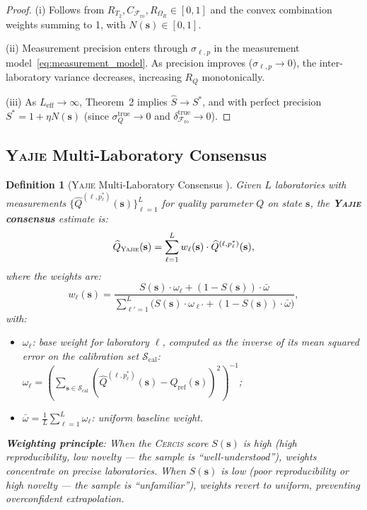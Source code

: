 \documentclass[11pt,a4paper]{article}
\newcommand{\eff}{\mathrm{eff}}
\newtheorem{definition}[theorem]{Definition}
\theoremstyle{definition}
\newcommand{\Yajie}{\textsc{Yajie}}
\newcommand{\Cercis}{\textsc{Cercis}}
\newcommand{\cS}{\mathcal{S}}
\newcommand{\Ttwo}{T_2}
\newcommand{\RabiFreq}{\Omega_R}
\newcommand{\FidReadout}{\mathcal{F}_{\text{ro}}}
\begin{document}
\begin{proof}
(i) Follows from $R_{\Ttwo}, C_{\FidReadout}, R_{\RabiFreq} \in [0,1]$
and the convex combination weights summing to 1, with $N(\mathbf{s}) \in [0,1]$.

(ii) Measurement precision enters through $\sigma_{\ell, p}$ in the
measurement model~\eqref{eq:measurement_model}. As precision improves
($\sigma_{\ell, p} \to 0$), the inter-laboratory variance decreases,
increasing $R_Q$ monotonically.

(iii) As $L_{\eff} \to \infty$, Theorem~2 implies $\widehat{S} \to S^*$,
and with perfect precision $S^* = 1 + \eta N(\mathbf{s})$ (since
$\sigma_Q^{\text{true}} \to 0$ and $\delta_{\FidReadout}^{\text{true}} \to 0$).
\end{proof}

\subsection{\Yajie{} Multi-Laboratory Consensus}

\begin{definition}[\Yajie{} Multi-Laboratory Consensus ]
\label{def:yajie}
Given $L$ laboratories with measurements $\{\widehat{Q}^{(\ell, p^*_\ell)}(\mathbf{s})\}_{\ell=1}^{L}$
for quality parameter $Q$ on state $\mathbf{s}$, the \textbf{\Yajie{} consensus}
estimate is:
\begin{equation}
    \widehat{Q}_{\Yajie}(\mathbf{s}) = \sum_{\ell=1}^{L} w_\ell(\mathbf{s}) \cdot \widehat{Q}^{(\ell, p^*_\ell)}(\mathbf{s}),
    \label{eq:yajie_consensus}
\end{equation}
where the weights are:
\begin{equation}
    w_\ell(\mathbf{s}) = \frac{S(\mathbf{s}) \cdot \omega_\ell + (1 - S(\mathbf{s})) \cdot \bar{\omega}}
                          {\sum_{\ell'=1}^{L} \bigl(S(\mathbf{s}) \cdot \omega_{\ell'} + (1 - S(\mathbf{s})) \cdot \bar{\omega}\bigr)},
    \label{eq:yajie_weights}
\end{equation}
with:
\begin{itemize}[nosep]
    \item $\omega_\ell$: base weight for laboratory $\ell$, computed as
    the inverse of its mean squared error on the calibration set $\cS_{\text{cal}}$:
    $\omega_\ell = \left(\sum_{\mathbf{s} \in \cS_{\text{cal}}} (\widehat{Q}^{(\ell, p^*_\ell)}(\mathbf{s}) - Q_{\text{ref}}(\mathbf{s}))^2\right)^{-1}$;
    \item $\bar{\omega} = \frac{1}{L} \sum_{\ell=1}^{L} \omega_\ell$: uniform baseline weight.
\end{itemize}

\textbf{Weighting principle}: When the \Cercis{} score $S(\mathbf{s})$ is high
(high reproducibility, low novelty — the sample is ``well-understood''),
weights concentrate on precise laboratories. When $S(\mathbf{s})$ is low
(poor reproducibility or high novelty — the sample is ``unfamiliar''),
weights revert to uniform, preventing overconfident extrapolation.
\end{definition}
\end{document}
